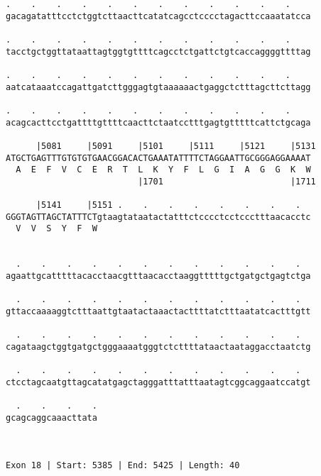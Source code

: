 \documentclass{article}
\begin{document}
\begin{Verbatim}
.    .    .    .    .    .    .    .    .    .    .    .    
gacagatatttcctctggtcttaacttcatatcagcctcccctagacttccaaatatcca
                                                            
.    .    .    .    .    .    .    .    .    .    .    .    
tacctgctggttataattagtggtgttttcagcctctgattctgtcaccaggggttttag
                                                            
.    .    .    .    .    .    .    .    .    .    .    .    
aatcataaatccagattgatcttgggagtgtaaaaaactgaggctctttagcttcttagg
                                                            
.    .    .    .    .    .    .    .    .    .    .    .    
acagcacttcctgattttgttttcaacttctaatcctttgagtgtttttcattctgcaga
                                                            
      |5081     |5091     |5101     |5111     |5121     |5131
ATGCTGAGTTTGTGTGTGAACGGACACTGAAATATTTTCTAGGAATTGCGGGAGGAAAAT
  A  E  F  V  C  E  R  T  L  K  Y  F  L  G  I  A  G  G  K  W
                          |1701                         |1711
  
      |5141     |5151 .    .    .    .    .    .    .    .  
GGGTAGTTAGCTATTTCTgtaagtataatactatttctcccctcctccctttaacacctc
  V  V  S  Y  F  W                                          
                                                            
  
  .    .    .    .    .    .    .    .    .    .    .    .  
agaattgcatttttacacctaacgtttaacacctaaggtttttgctgatgctgagtctga
                                                            
  .    .    .    .    .    .    .    .    .    .    .    .  
gttaccaaaaggtctttaattgtaatactaaactacttttatctttaatatcactttgtt
                                                            
  .    .    .    .    .    .    .    .    .    .    .    .  
cagataagctggtgatgctgggaaaatgggtctcttttataactaataggacctaatctg
                                                            
  .    .    .    .    .    .    .    .    .    .    .    .  
ctcctagcaatgttagcatatgagctagggatttatttaatagtcggcaggaatccatgt
                                                            
  .    .    .    .
gcagcaggcaaacttata
                  
                  
 
Exon 18 | Start: 5385 | End: 5425 | Length: 40




\end{Verbatim}
\end{document}
